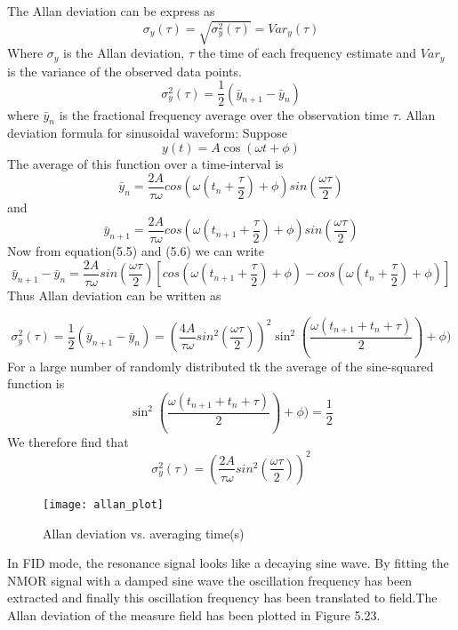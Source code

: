 \documentclass[12pt]{report}
\begin{document}
The Allan deviation can be express as
\begin{equation}
\sigma_y(\tau)=\sqrt{\sigma_y^2(\tau)}=Var_y(\tau)
\end{equation}
Where $\sigma_y$ is the Allan deviation, $\tau$ the time of each frequency estimate and $Var_y$ is the variance of the observed data points.
\begin{equation}
{\sigma_y^2(\tau)}=\frac{1}{2}(\bar{y}_{n+1}-\bar{y}_{n})
\end{equation}
where $\bar{y}_{n}$ is the fractional frequency average over the observation time $\tau$.
Allan deviation formula for sinusoidal waveform:
Suppose
\begin{equation}
y(t) = A\cos (\omega t + \phi)
\end{equation}
The average of this function over a time-interval  is
\begin{equation}
\bar{y}_{n}=\frac{2A}
{\tau \omega}
cos(\omega(t_n +\frac{\tau}{2})+\phi)sin(\frac{\omega \tau}{2})
\end{equation}
and
\begin{equation}
\bar{y}_{n+1}=\frac{2A}
{\tau \omega}
cos(\omega(t_{n+1} +\frac{\tau}{2})+\phi)sin(\frac{\omega \tau}{2})
\end{equation}
Now from equation(5.5) and (5.6) we can write
\begin{equation}
\bar{y}_{n+1}-\bar{y}_{n}=\frac{2A}
{\tau \omega}sin(\frac{\omega \tau}{2})[cos( \omega(t_{n+1} +\frac{\tau}{2})+\phi)-cos(\omega(t_n +\frac{\tau}{2})+\phi)]
\end{equation}
Thus Allan deviation can be written as

\begin{equation}
{\sigma_y^2(\tau)}=\frac{1}{2}(\bar{y}_{n+1}-\bar{y}_{n})=(\frac{4A}
{\tau \omega}sin^2(\frac{\omega \tau}{2}))^2 \sin^2     (\frac{\omega(t_{n+1} +t_{n}+\tau)}{2})+\phi)
\end{equation}
For a large number of randomly
distributed tk the average of the sine-squared function is
\begin{equation}
\sin^2    (\frac{\omega(t_{n+1} +t_{n}+\tau)}{2})+\phi)=\frac{1}{2}
\end{equation}
We therefore find that
\begin{equation}
{\sigma_y^2(\tau)}=(\frac{2A}
{\tau \omega}sin^2(\frac{\omega \tau}{2}))^2
\end{equation}
\begin{figure}[h]
\centering\texttt{[image: allan\_plot]}
\caption{Allan deviation vs. averaging time(s)}
\end{figure}
In FID mode, the resonance signal looks like a decaying sine wave. By fitting the NMOR signal with a damped sine wave the oscillation frequency has been extracted and finally this oscillation frequency has been translated to field.The Allan deviation of the measure field has been plotted in Figure 5.23.
\newpage
\end{document}

